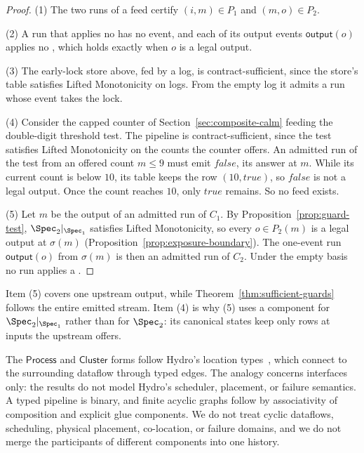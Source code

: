 \begin{proof}
(1) The two runs of a feed certify $(i,m)\in P_1$ and $(m,o)\in P_2$.

(2) A run that applies no \commitment has no \commitment event, and each of its
output events $\mathsf{output}(o)$ applies no \commitment, which holds exactly
when $o$ is a legal output.

(3) The early-lock store above, fed by a log, is contract-sufficient, since the
store's table satisfies Lifted Monotonicity on logs.  From the empty log it
admits a run whose \commitment event takes the lock.

(4) Consider the capped counter of Section~\ref{sec:composite-calm} feeding
the double-digit threshold test.  The pipeline is contract-sufficient, since the
test satisfies Lifted Monotonicity on the counts the counter offers.  An
admitted run of the test from an offered count $m\le 9$ must emit
$\mathit{false}$, its answer at $m$.  While its current count is below $10$,
its table keeps the row $(10,\mathit{true})$, so $\mathit{false}$ is not a
legal output.  Once the count reaches $10$, only $\mathit{true}$ remains.  So
no feed exists.

(5) Let $m$ be the output of an admitted run of $C_1$.  By Proposition~\ref{prop:guard-test}, $\Spec_2|_{\Spec_1}$ satisfies
Lifted Monotonicity, so every $o\in P_2(m)$ is a legal output at $\sigma(m)$
(Proposition~\ref{prop:exposure-boundary}).  The one-event run
$\mathsf{output}(o)$ from $\sigma(m)$ is then an admitted run of $C_2$.
Under the empty basis no run applies a \commitment.
\end{proof}

Item (5) covers one upstream output, while
Theorem~\ref{thm:sufficient-guards} follows the entire emitted stream.
Item (4) is why (5) uses a component for $\Spec_2|_{\Spec_1}$ rather than for
$\Spec_2$: its canonical states keep only rows at inputs the upstream offers.

The $\mathsf{Process}$ and $\mathsf{Cluster}$ forms follow Hydro's location
types~\cite{hydro}, which connect to the surrounding dataflow through typed
edges.  The analogy concerns interfaces only: the results do not model
Hydro's scheduler, placement, or failure semantics.  A typed pipeline is
binary, and finite acyclic graphs follow by associativity of composition and
explicit glue components.  We do not treat cyclic dataflows, scheduling,
physical placement, co-location, or failure domains, and we do not merge the
participants of different components into one history.
